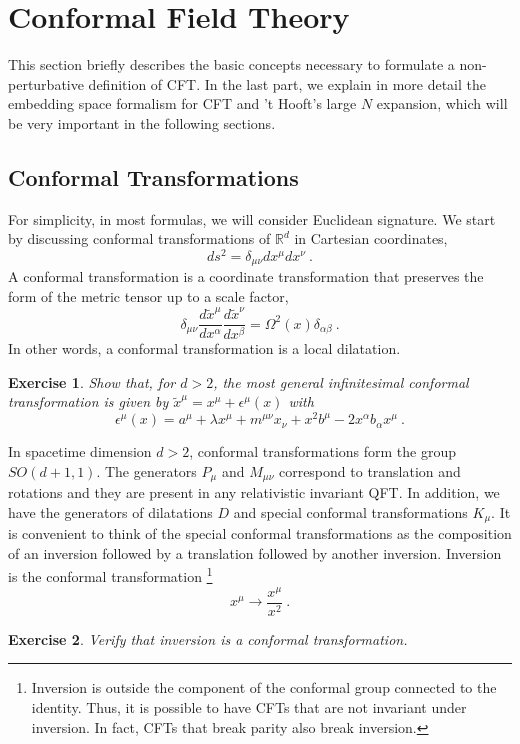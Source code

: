 \documentclass{ws-rv9x6}
\newtheorem{exercise}{Exercise}[section]
\newcommand\be{\begin{equation}}
\newcommand\ee{\end{equation}}
\begin{document}
\section{Conformal Field Theory \label{sec:CFT}}

This section briefly describes the basic concepts necessary to formulate a non-perturbative definition of CFT.
In the last part, we explain in more detail the embedding space formalism for CFT and 't Hooft's large $N$ expansion, which will be very important in the following sections.

\subsection{Conformal Transformations}

For simplicity, in most formulas, we will consider Euclidean signature.
We start by discussing conformal transformations of $\mathbb{R}^{d}$
in Cartesian coordinates,
\be
ds^{2}=\delta_{\mu\nu}dx^{\mu}dx^{\nu}\ .
\ee
A conformal transformation is a coordinate transformation that preserves
the form of the metric tensor up to a scale factor,
\begin{equation}
\delta_{\mu\nu}\frac{d\tilde{x}^{\mu}}{dx^{\alpha}}\frac{d\tilde{x}^{\nu}}{dx^{\beta}}=\Omega^{2}(x)\delta_{\alpha\beta}\ .\label{eq:conftransf}
\end{equation}
In other words, a conformal transformation is a local dilatation. 
 
\begin{exercise} 
Show that, for $d>2$, the most general infinitesimal conformal
transformation is given by $\tilde{x}^{\mu}=x^{\mu}+\epsilon^{\mu}(x)$
with
\begin{equation}
\epsilon^{\mu}(x)=a^{\mu}+\lambda x^{\mu}+m^{\mu\nu}x_{\nu}+x^{2}b^{\mu}-2x^{\alpha}b_{\alpha}x^{\mu}\ .\label{eq:InfinitesimalConfTransf}
\end{equation}
\end{exercise}
 

In spacetime dimension $d>2$, conformal transformations form the
group $SO(d+1,1)$. The generators $P_{\mu}$ and $M_{\mu\nu}$ correspond
to translation and rotations and they are present in any relativistic
invariant QFT. In addition, we have the generators of dilatations
$D$ and special conformal transformations $K_{\mu}$. It is convenient
to think of the special conformal transformations as the composition
of an inversion followed by a translation followed by another inversion.
Inversion is the conformal transformation%
\footnote{Inversion is outside the component of the conformal group connected
to the identity. Thus, it is possible to have CFTs that are not invariant
under inversion. In fact, CFTs that break parity also break inversion. %
}
\be
x^{\mu}\to\frac{x^{\mu}}{x^{2}}\ .
\ee
\begin{exercise}
Verify that inversion is a conformal transformation.
\end{exercise}
\end{document}
